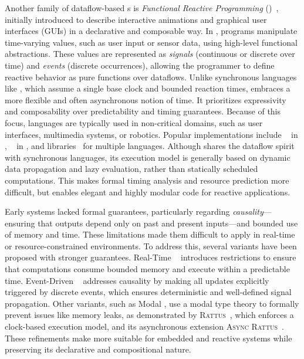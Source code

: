 Another family of dataflow-based \dsl{}s is \emph{Functional Reactive Programming}
(\frp)~\cite{DBLP:conf/icfp/ElliottH97}, initially introduced to describe interactive animations and
graphical user interfaces (GUIs) in a declarative and composable way. In \frp, programs manipulate
time-varying values, such as user input or sensor data, using high-level functional abstractions.
These values are represented as \emph{signals} (continuous or discrete over time) and \emph{events}
(discrete occurrences), allowing the programmer to define reactive behavior as pure functions over
dataflows. Unlike synchronous languages like \Lustre, which assume a single base clock and bounded
reaction times, \frp embraces a more flexible and often asynchronous notion of time. It prioritizes
expressivity and composability over predictability and timing guarantees.
%
Because of this focus, \frp languages are typically used in non-critical domains, such as user
interfaces, multimedia systems, or robotics. Popular \frp implementations include
\Yampa~\cite{DBLP:conf/haskell/CourtneyNP03} in \Haskell, \Elm~\cite{DBLP:conf/pldi/CzaplickiC13}
in \JavaScript, and \ReactiveX libraries~\cite{reactivex} for multiple languages. Although \frp
shares the dataflow spirit with synchronous languages, its execution model is generally based on
dynamic data propagation and lazy evaluation, rather than statically scheduled computations. This
makes formal timing analysis and resource prediction more difficult, but enables elegant and highly
modular code for reactive applications.

Early \frp systems lacked formal guarantees, particularly regarding \emph{causality}---ensuring that
outputs depend only on past and present inputs---and bounded use of memory and time. These
limitations made them difficult to apply in real-time or resource-constrained environments. To
address this, several \frp variants have been proposed with stronger guarantees. Real-Time
\frp~\cite{DBLP:conf/icfp/WanTH01} introduces restrictions to ensure that computations consume
bounded memory and execute within a predictable time. Event-Driven
\frp~\cite{DBLP:conf/padl/WanTH02} addresses causality by making all updates explicitly triggered by
discrete events, which ensures deterministic and well-defined signal propagation. Other variants,
such as Modal \frp, use a modal type theory to formally prevent issues like memory leaks, as
demonstrated by \textsc{Rattus}~\cite{DBLP:journals/pacmpl/BahrGM19}, which enforces a clock-based
execution model, and its asynchronous extension
\textsc{Async Rattus}~\cite{DBLP:journals/pacmpl/BahrM23}. These
refinements make \frp more suitable for embedded and reactive systems while preserving its
declarative and compositional nature.

